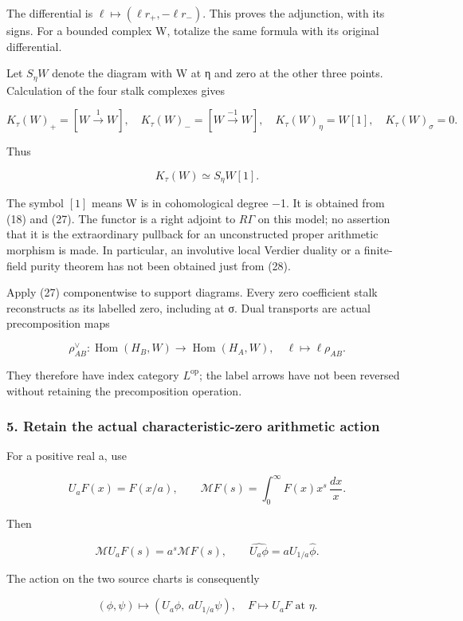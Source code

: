 \documentclass{article}
\begin{document}
The differential is \(\ell\mapsto(\ell r_+,-\ell r_-)\). This proves the adjunction, with its signs. For a bounded complex W, totalize the same formula with its original differential.

Let \(S_\eta W\) denote the diagram with W at η and zero at the other three points. Calculation of the four stalk complexes gives

\[
K_\tau(W)_+=[W\xrightarrow{1}W],\quad
K_\tau(W)_-=[W\xrightarrow{-1}W],\quad
K_\tau(W)_\eta=W[1],\quad K_\tau(W)_\sigma=0.
\tag{29}
\]

Thus

\[
\boxed{K_\tau(W)\simeq S_\eta W[1].}
\tag{30}
\]

The symbol \([1]\) means W is in cohomological degree −1. It is obtained from (18) and (27). The functor is a right adjoint to \(R\Gamma\) on this model; no assertion that it is the extraordinary pullback for an unconstructed proper arithmetic morphism is made. In particular, an involutive local Verdier duality or a finite-field purity theorem has not been obtained just from (28).

Apply (27) componentwise to support diagrams. Every zero coefficient stalk reconstructs as its labelled zero, including at σ. Dual transports are actual precomposition maps

\[
\rho_{AB}^{\vee}:\operatorname{Hom}(H_B,W)\longrightarrow
\operatorname{Hom}(H_A,W),\quad\ell\mapsto\ell\rho_{AB}.
\tag{31}
\]

They therefore have index category \(L^{\mathrm{op}}\); the label arrows have not been reversed without retaining the precomposition operation.

\subsubsection{5. Retain the actual characteristic-zero arithmetic action}\label{endpoint-tau_base--retain-the-actual-characteristic-zero-arithmetic-action}

For a positive real a, use

\[
U_aF(x)=F(x/a),\qquad
\mathcal M F(s)=\int_0^\infty F(x)x^s\,\frac{dx}{x}.
\tag{32}
\]

Then

\[
\mathcal M U_aF(s)=a^s\mathcal MF(s),\qquad
\widehat{U_a\phi}=aU_{1/a}\widehat\phi.
\tag{33}
\]

The action on the two source charts is consequently

\[
(\phi,\psi)\longmapsto(U_a\phi,\ aU_{1/a}\psi),
\quad
F\longmapsto U_aF\text{ at }\eta.
\tag{34}
\]
\end{document}

